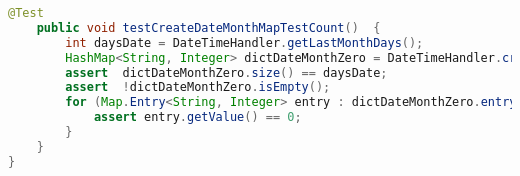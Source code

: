\begin{lstlisting}[language=Java]
    @Test
    public void testCreateDateMonthMapTestCount()  {
        int daysDate = DateTimeHandler.getLastMonthDays();
        HashMap<String, Integer> dictDateMonthZero = DateTimeHandler.createDateMonthMapTestCount();
        assert  dictDateMonthZero.size() == daysDate;
        assert  !dictDateMonthZero.isEmpty();
        for (Map.Entry<String, Integer> entry : dictDateMonthZero.entrySet()) {
            assert entry.getValue() == 0;
        }
    }
}
\end{lstlisting}


